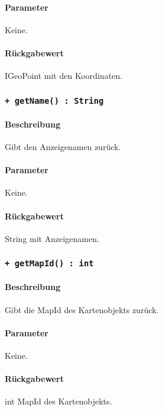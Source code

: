 \paragraph*{Parameter}
Keine.
\paragraph*{Rückgabewert}
IGeoPoint mit den Koordinaten.

\subsubsection*{\texttt{+ getName() : String}}%
\paragraph*{Beschreibung}
Gibt den Anzeigenamen zurück.
\paragraph*{Parameter}
Keine.
\paragraph*{Rückgabewert}
String mit Anzeigenamen.

\subsubsection*{\texttt{+ getMapId() : int}}%
\paragraph*{Beschreibung}
Gibt die MapId des Kartenobjekts zurück.
\paragraph*{Parameter}
Keine.
\paragraph*{Rückgabewert}
int MapId des Kartenobjekts.